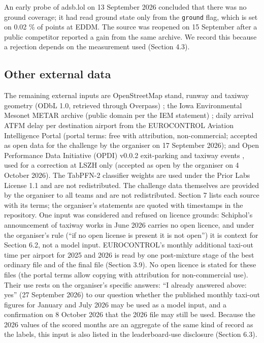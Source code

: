 \documentclass[11pt,a4paper]{article}
\begin{document}
An early probe of adsb.lol on 13 September 2026 concluded that there was no ground coverage; it had read ground state only from the \texttt{ground} flag, which is set on 0.02 \% of points at EDDM. The source was reopened on 15 September after a public competitor reported a gain from the same archive. We record this because a rejection depends on the measurement used (Section 4.3).

\subsection{Other external data}\label{other-external-data}

The remaining external inputs are OpenStreetMap stand, runway and taxiway geometry (ODbL 1.0, retrieved through Overpass) \autocite{osm}; the Iowa Environmental Mesonet METAR archive (public domain per the IEM statement) \autocite{iem}; daily arrival ATFM delay per destination airport from the EUROCONTROL Aviation Intelligence Portal (portal terms: free with attribution, non-commercial; accepted as open data for the challenge by the organiser on 17 September 2026); and Open Performance Data Initiative (OPDI) v0.0.2 exit-parking and taxiway events \autocite{opdi}, used for a correction at LSZH only (accepted as open by the organiser on 4 October 2026). The TabPFN-2 classifier weights are used under the Prior Labs License 1.1 and are not redistributed. The challenge data themselves are provided by the organiser to all teams and are not redistributed. Section 7 lists each source with its terms; the organiser's statements are quoted with timestamps in the repository. One input was considered and refused on licence grounds: Schiphol's announcement of taxiway works in June 2026 carries no open licence, and under the organiser's rule (``if no open license is present it is not open'') it is context for Section 6.2, not a model input. EUROCONTROL's monthly additional taxi-out time per airport for 2025 and 2026 \autocite{eurocontrol2026atxotdata} is read by one post-mixture stage of the best ordinary file and of the final file (Section 3.9). No open licence is stated for these files (the portal terms allow copying with attribution for non-commercial use). Their use rests on the organiser's specific answers: ``I already answered above: yes'' (27 September 2026) to our question whether the published monthly taxi-out figures for January and July 2026 may be used as a model input, and a confirmation on 8 October 2026 that the 2026 file may still be used. Because the 2026 values of the scored months are an aggregate of the same kind of record as the labels, this input is also listed in the leaderboard-use disclosure (Section 6.3).
\end{document}
